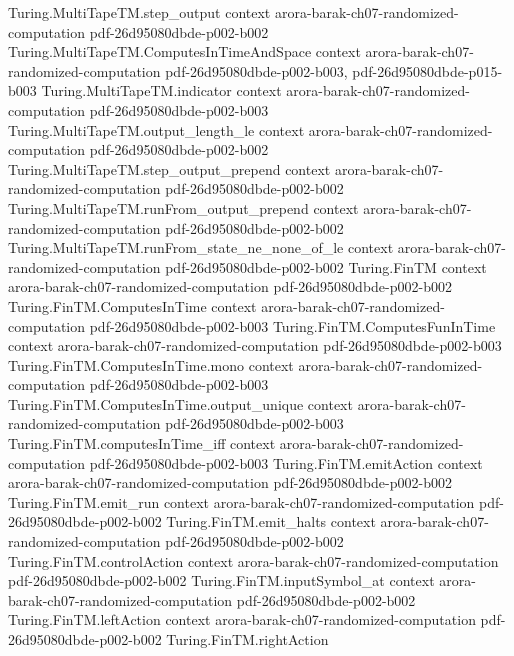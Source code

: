 \begin{theorem}
\proofstep
  {Turing.MultiTapeTM.step_output}
  {context}
  {arora-barak-ch07-randomized-computation}
  {pdf-26d95080dbde-p002-b002}
\proofstep
  {Turing.MultiTapeTM.ComputesInTimeAndSpace}
  {context}
  {arora-barak-ch07-randomized-computation}
  {pdf-26d95080dbde-p002-b003,
    pdf-26d95080dbde-p015-b003}
\proofstep
  {Turing.MultiTapeTM.indicator}
  {context}
  {arora-barak-ch07-randomized-computation}
  {pdf-26d95080dbde-p002-b003}
\proofstep
  {Turing.MultiTapeTM.output_length_le}
  {context}
  {arora-barak-ch07-randomized-computation}
  {pdf-26d95080dbde-p002-b002}
\proofstep
  {Turing.MultiTapeTM.step_output_prepend}
  {context}
  {arora-barak-ch07-randomized-computation}
  {pdf-26d95080dbde-p002-b002}
\proofstep
  {Turing.MultiTapeTM.runFrom_output_prepend}
  {context}
  {arora-barak-ch07-randomized-computation}
  {pdf-26d95080dbde-p002-b002}
\proofstep
  {Turing.MultiTapeTM.runFrom_state_ne_none_of_le}
  {context}
  {arora-barak-ch07-randomized-computation}
  {pdf-26d95080dbde-p002-b002}
\proofstep
  {Turing.FinTM}
  {context}
  {arora-barak-ch07-randomized-computation}
  {pdf-26d95080dbde-p002-b002}
\proofstep
  {Turing.FinTM.ComputesInTime}
  {context}
  {arora-barak-ch07-randomized-computation}
  {pdf-26d95080dbde-p002-b003}
\proofstep
  {Turing.FinTM.ComputesFunInTime}
  {context}
  {arora-barak-ch07-randomized-computation}
  {pdf-26d95080dbde-p002-b003}
\proofstep
  {Turing.FinTM.ComputesInTime.mono}
  {context}
  {arora-barak-ch07-randomized-computation}
  {pdf-26d95080dbde-p002-b003}
\proofstep
  {Turing.FinTM.ComputesInTime.output_unique}
  {context}
  {arora-barak-ch07-randomized-computation}
  {pdf-26d95080dbde-p002-b003}
\proofstep
  {Turing.FinTM.computesInTime_iff}
  {context}
  {arora-barak-ch07-randomized-computation}
  {pdf-26d95080dbde-p002-b003}
\proofstep
  {Turing.FinTM.emitAction}
  {context}
  {arora-barak-ch07-randomized-computation}
  {pdf-26d95080dbde-p002-b002}
\proofstep
  {Turing.FinTM.emit_run}
  {context}
  {arora-barak-ch07-randomized-computation}
  {pdf-26d95080dbde-p002-b002}
\proofstep
  {Turing.FinTM.emit_halts}
  {context}
  {arora-barak-ch07-randomized-computation}
  {pdf-26d95080dbde-p002-b002}
\proofstep
  {Turing.FinTM.controlAction}
  {context}
  {arora-barak-ch07-randomized-computation}
  {pdf-26d95080dbde-p002-b002}
\proofstep
  {Turing.FinTM.inputSymbol_at}
  {context}
  {arora-barak-ch07-randomized-computation}
  {pdf-26d95080dbde-p002-b002}
\proofstep
  {Turing.FinTM.leftAction}
  {context}
  {arora-barak-ch07-randomized-computation}
  {pdf-26d95080dbde-p002-b002}
\proofstep
  {Turing.FinTM.rightAction}

\end{theorem}
